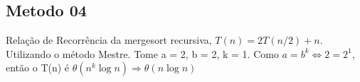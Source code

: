 \subsection{Metodo 04}
Relação de Recorrência da mergesort recursiva, $T(n) = 2T(n/2) + n$. Utilizando o método Mestre.
Tome a = 2, b = 2, k = 1. Como $a = b^k \Leftrightarrow 2 = 2^1$, então o T(n) é $\theta(n^k \log{n}) \Rightarrow \theta(n \log{n})$